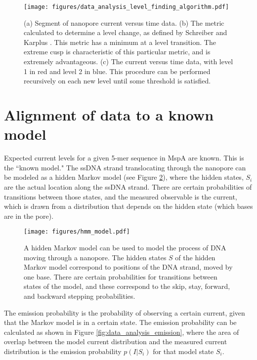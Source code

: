 \begin{figure}[H]
\begin{centering}
\texttt{[image: figures/data\_analysis\_level\_finding\_algorithm.pdf]}
\caption[Data analysis: level-finding algorithm]{(a) Segment of nanopore current versus time data.  (b) The metric calculated to determine a level change, as defined by Schreiber and Karplus \citep{Schreiber2015}.  This metric has a minimum at a level transition.  The extreme cusp is characteristic of this particular metric, and is extremely advantageous.  (c) The current versus time data, with level 1 in red and level 2 in blue.  This procedure can be performed recursively on each new level until some threshold is satisfied.}
\label{fig:data_analysis_level_alg}
\end{centering}
\end{figure}

\section{Alignment of data to a known model}
\label{level_alignment}

Expected current levels for a given 5-mer sequence in MspA are known.  This is the ``known model."  The ssDNA strand translocating through the nanopore can be modeled as a hidden Markov model (see Figure \ref{fig:data_analysis_hmm}), where the hidden states, $S_i$ are the actual location along the ssDNA strand.  There are certain probabilities of transitions between those states, and the measured observable is the current, which is drawn from a distribution that depends on the hidden state (which bases are in the pore).

\begin{figure}[h]
\begin{centering}
\texttt{[image: figures/hmm\_model.pdf]}
\caption[Data analysis: hidden Markov model]{A hidden Markov model can be used to model the process of DNA moving through a nanopore.  The hidden states $S$ of the hidden Markov model correspond to positions of the DNA strand, moved by one base.  There are certain probabilities for transitions between states of the model, and these correspond to the skip, stay, forward, and backward stepping probabilities.}
\label{fig:data_analysis_hmm}
\end{centering}
\end{figure}

The emission probability is the probability of observing a certain current, given that the Markov model is in a certain state.  The emission probability can be calculated as shown in Figure \ref{fig:data_analysis_emission}, where the area of overlap between the model current distribution and the measured current distribution is the emission probability $p(I|S_i)$ for that model state $S_i$.

